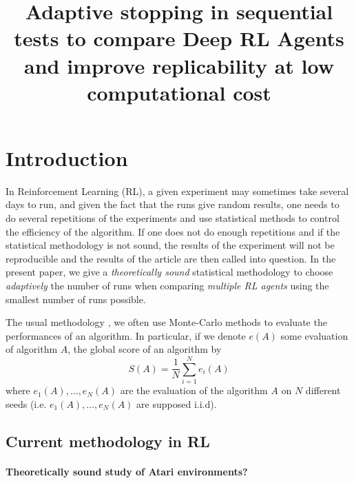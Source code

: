 \documentclass{article}
\title{Adaptive stopping in sequential tests to compare Deep RL Agents and improve replicability at low computational cost}
\date{}
\theoremstyle{plain}
\theoremstyle{remark}
\newcommand{\1}{\mathbbm{1}}
\newcommand{\todoT}[1]{\todo[inline,color=blue!30]{{\textbf{T:}~}#1}}
\numberwithin{equation}{section}
\begin{document}
\maketitle
\section{Introduction}
 In Reinforcement Learning (RL), a given experiment may sometimes take several days to run, and given the fact that the runs give random results, one needs to do several repetitions of the experiments and use statistical methods to control the efficiency of the algorithm. If one does not do enough repetitions and if the statistical methodology is not sound, the results of the experiment will not be reproducible and the results of the article are then called into question. In the present paper, we give a \textit{theoretically sound} statistical methodology to choose \textit{adaptively} the number of runs when comparing \textit{multiple RL agents} using the smallest number of runs possible.

\todoT{Continue introduction}

The usual methodology , we often use Monte-Carlo methods to evaluate the performances of an algorithm. In particular, if we denote $e(A)$ some evaluation of algorithm $A$, the global score of an algorithm by
$$S(A)=\frac{1}{N}\sum_{i=1}^N e_i(A) $$
where $e_1(A), \dots,e_N(A)$ are the evaluation of the algorithm $A$ on $N$ different seeds (i.e. $e_1(A),\dots,e_N(A)$ are supposed i.i.d).

\subsection{Current methodology in RL}
\paragraph{Theoretically sound study of Atari environments?}
\end{document}
